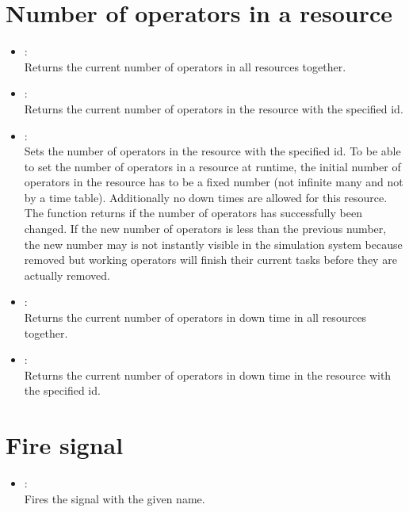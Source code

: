 \section{Number of operators in a resource}

\begin{itemize}

\item
{}:\\
Returns the current number of operators in all resources together.
  
\item
{}:\\
Returns the current number of operators in the resource with the specified id.  
  
\item
{}:\\
Sets the number of operators in the resource with the specified id.
To be able to set the number of operators in a resource at runtime,
the initial number of operators in the resource has to be a fixed number
(not infinite many and not by a time table). Additionally no down times
are allowed for this resource.
The function returns  if the number of operators has successfully 
been changed. If the new number of operators is less than the previous number,
the new number may is not instantly visible in the simulation system because
removed but working operators will finish their current tasks before they are
actually removed.

\item
{}:\\
Returns the current number of operators in down time in all resources together.

\item
{}:\\
Returns the current number of operators in down time in the resource with the specified id.

\end{itemize}

\section{Fire signal}

\begin{itemize}

\item
{}:\\
Fires the signal with the given name.

\end{itemize}


